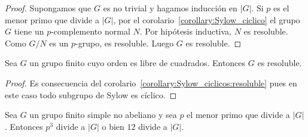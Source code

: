 
\begin{proof}
	Supongamos que $G$ es no trivial y hagamos inducción en $|G|$. Si $p$ es el
	menor primo que divide a $|G|$, por el
	corolario~\ref{corollary:Sylow_ciclico} el grupo $G$ tiene un
	$p$-complemento normal $N$. Por hipótesis inductiva, $N$ es resoluble. Como
	$G/N$ es un $p$-grupo, es resoluble. Luego $G$ es resoluble.
\end{proof}

\begin{corollary}
	Sea $G$ un grupo finito cuyo orden es libre de cuadrados. Entonces $G$ es
	resoluble.
\end{corollary}

\begin{proof}
	Es consecuencia del corolario~\ref{corollary:Sylow_ciclicos:resoluble} pues
	en este caso todo subgrupo de Sylow es cíclico.  
\end{proof}

\begin{corollary}
	Sea $G$ un grupo finito simple no abeliano y sea $p$ el menor primo que
	divide a $|G|$. Entonces $p^3$ divide a $|G|$ o bien $12$ divide a $|G|$.
\end{corollary}

